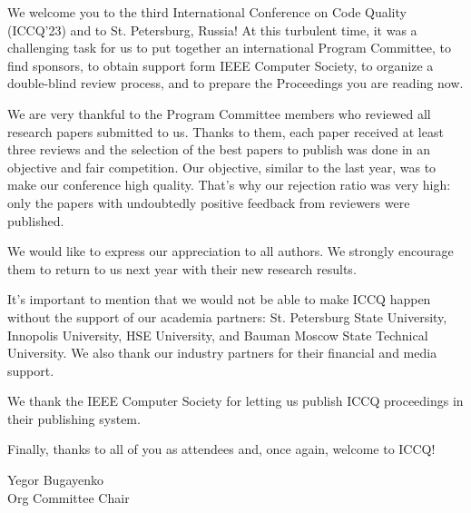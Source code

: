 \cleardoublepage
{}

We welcome you to the third International Conference on Code Quality (ICCQ'23)
and to St. Petersburg, Russia! At this turbulent time,
it was a challenging task for us
to put together an international Program Committee,
to find sponsors,
to obtain support form IEEE Computer Society,
to organize a double-blind review process,
and to prepare the Proceedings you are reading now.

We are very thankful to the Program Committee members who
reviewed all research papers submitted to us. Thanks to them,
each paper received at least three reviews and the selection of the best papers to publish
was done in an objective and fair competition. Our objective,
similar to the last year, was to make our conference high quality.
That's why our rejection ratio was very high: only the
papers with undoubtedly positive feedback from reviewers were published.

We would like to express our appreciation to all authors.
We strongly encourage them to return to us next year
with their new research results.

It's important to mention that we would not be able to make
ICCQ happen without the support of our academia partners:
St. Petersburg State University,
Innopolis University,
HSE University,
and
Bauman Moscow State Technical University.
We also thank our industry partners for their financial and media support.

We thank the IEEE Computer Society for letting us publish ICCQ proceedings
in their publishing system.

Finally, thanks to all of you as attendees and, once again, welcome to ICCQ!

\vspace{18pt}
Yegor Bugayenko\\
Org Committee Chair
